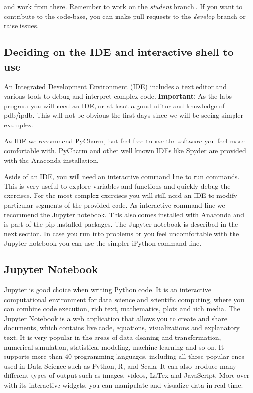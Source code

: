 \noindent and work from there. Remember to work on the \textit{student} branch!. If you want to contribute to the code-base, you can make pull requests to the \textit{develop} branch or raise issues.

\subsection{Deciding on the IDE and interactive shell to use}

An Integrated Development Environment (IDE) includes a text editor and various tools to debug and interpret complex code. \textbf{Important:} As the labs progress you will need an IDE, or at least a good editor and knowledge of pdb/ipdb. This will not be obvious the first days since we will be seeing simpler examples.

As IDE we recommend PyCharm, but feel free to use the software you feel more comfortable with. PyCharm and other well known IDEs like Spyder are provided with the Anaconda installation.

Aside of an IDE, you will need an interactive command line to run commands. This is very useful to explore variables and functions and quickly debug the exercises. For the most complex exercises you will still need an IDE to modify particular segments of the provided code. As interactive command line we recommend the Jupyter notebook. This also comes installed with Anaconda and is part of the pip-installed packages. The Jupyter notebook is described in the next section. In case you run into problems or you feel uncomfortable with the Jupyter notebook you can use the simpler iPython command line.

\subsection{Jupyter Notebook}

Jupyter is good choice when writing Python code. It is an interactive computational environment for data science and scientific computing, where you can combine code execution, rich text, mathematics, plots and rich media. The Jupyter Notebook is a web application that allows you to create and share documents, which contains live code, equations, visualizations and explanatory text. It is very popular in the areas of data cleaning and transformation, numerical simulation, statistical modeling, machine learning and so on. It supports more than 40 programming languages, including all those popular ones used in Data Science such as Python, R, and Scala. It can also produce many different types of output such as images, videos, LaTex and JavaScript. More over with its interactive widgets, you can manipulate and visualize data in real time.

